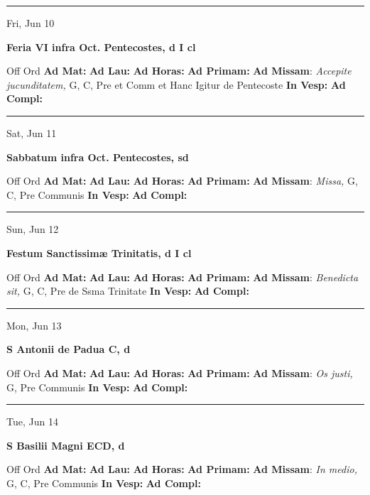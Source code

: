 \documentclass[letterpaper, 10pt]{article}
\begin{document}
\hrule
\begin{center}
Fri, Jun 10
\end{center}\textbf{ \large Feria VI infra Oct. Pentecostes, \textnormal{\normalsize d I cl}}
\begin{justify}
Off Ord
\textbf{Ad Mat: }
\textbf{Ad Lau: }
\textbf{Ad Horas: }
\textbf{Ad Primam: }
\textbf{Ad Missam}: \textit{Accepite jucunditatem,} G, C, Pre et Comm et Hanc Igitur de Pentecoste
\textbf{In Vesp: }
\textbf{Ad Compl: }\end{justify}



\hrule
\begin{center}
Sat, Jun 11
\end{center}\textbf{ \large Sabbatum infra Oct. Pentecostes, \textnormal{\normalsize sd}}
\begin{justify}
Off Ord
\textbf{Ad Mat: }
\textbf{Ad Lau: }
\textbf{Ad Horas: }
\textbf{Ad Primam: }
\textbf{Ad Missam}: \textit{Missa,} G, C, Pre Communis
\textbf{In Vesp: }
\textbf{Ad Compl: }\end{justify}



\hrule
\begin{center}
Sun, Jun 12
\end{center}\textbf{ \large Festum Sanctissimæ Trinitatis, \textnormal{\normalsize d I cl}}
\begin{justify}
Off Ord
\textbf{Ad Mat: }
\textbf{Ad Lau: }
\textbf{Ad Horas: }
\textbf{Ad Primam: }
\textbf{Ad Missam}: \textit{Benedicta sit,} G, C, Pre de Ssma Trinitate
\textbf{In Vesp: }
\textbf{Ad Compl: }\end{justify}



\hrule
\begin{center}
Mon, Jun 13
\end{center}\textbf{ \large S Antonii de Padua C, \textnormal{\normalsize d}}
\begin{justify}
Off Ord
\textbf{Ad Mat: }
\textbf{Ad Lau: }
\textbf{Ad Horas: }
\textbf{Ad Primam: }
\textbf{Ad Missam}: \textit{Os justi,} G, Pre Communis
\textbf{In Vesp: }
\textbf{Ad Compl: }\end{justify}



\hrule
\begin{center}
Tue, Jun 14
\end{center}\textbf{ \large S Basilii Magni ECD, \textnormal{\normalsize d}}
\begin{justify}
Off Ord
\textbf{Ad Mat: }
\textbf{Ad Lau: }
\textbf{Ad Horas: }
\textbf{Ad Primam: }
\textbf{Ad Missam}: \textit{In medio,} G, C, Pre Communis
\textbf{In Vesp: }
\textbf{Ad Compl: }\end{justify}
\end{document}
